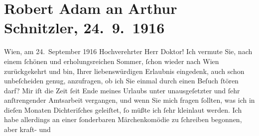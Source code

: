 

         
         \renewcommand{\erwaehntePersonen}{Personen: Charles de Coster, Alexandre père Dumas,  G. Lenotre, Ricarda Huch, Viktor Franz Patzner}
         \renewcommand{\erwaehnteOrte}{Orte: Wien}
         \renewcommand{\erwaehnteWerke}{Werke: Bleus, Blancs et Rouges, Der große Krieg in Deutschland, Jean Christophe, Le mariage de Monsieur de Bréchard, Meine Memoiren, Märchenkomödie, Tyll Ulenspiegel und Lamm Goedzak}
               \section[Robert Adam an Arthur Schnitzler, 24. 9. 1916]{ Robert Adam an Arthur Schnitzler, 24. 9. 1916}\nopagebreak{}\rehead{ }\begin{ledgroupsized}[t]{13cm}\normalsize\beginnumbering \toendnotes[C]{\smallbreak\pagebreak[2]} 
\toendnotes[C]{\smallbreak}\pstart
           \raggedleft{}{\pb}Wien, am 24. September 1916\pend
           \pstart{}Hochverehrter Herr Doktor!\pend\pstart
           Ich vermute Sie, nach einem ſchönen und erholungsreichen Sommer, ſchon wieder nach
                  Wien zurückgekehrt und bin, Ihrer
               liebenswürdigen Erlaubnis eingedenk, auch schon unbeſcheiden genug, anzufragen, ob
               ich Sie einmal durch einen Beſuch ſtören darf?\pend
           \pstart
           Mir iſt die Zeit ſeit Ende meines Urlaubs unter unausgeſetzter und ſehr anſtrengender
               Amtsarbeit vergangen, und wenn Sie mich fragen ſollten, was ich in dieſen Monaten
               Dichteriſches geleiſtet, ſo müßte ich ſehr kleinlaut werden. Ich habe allerdings an
               einer {\pb}ſonderbaren Märchenkomödie zu ſchreiben begonnen, aber kraft- und

\end{ledgroupsized}
